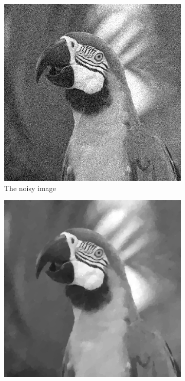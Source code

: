 \documentclass{article}
\begin{document}
\begin{figure}[htbp]
\begin{subfigure}[b]{0.24\textwidth}
        \includegraphics[width=\textwidth]{images/noisy_gray.png}
        \caption{The noisy image}
        \label{fig:noisy_gray}
    \end{subfigure}
    \hfill
    \begin{subfigure}[b]{0.24\textwidth}
        \centering
        \includegraphics[width=\textwidth]{images/TVdenoised_gray.png}

\end{subfigure}
\end{figure}
\end{document}
